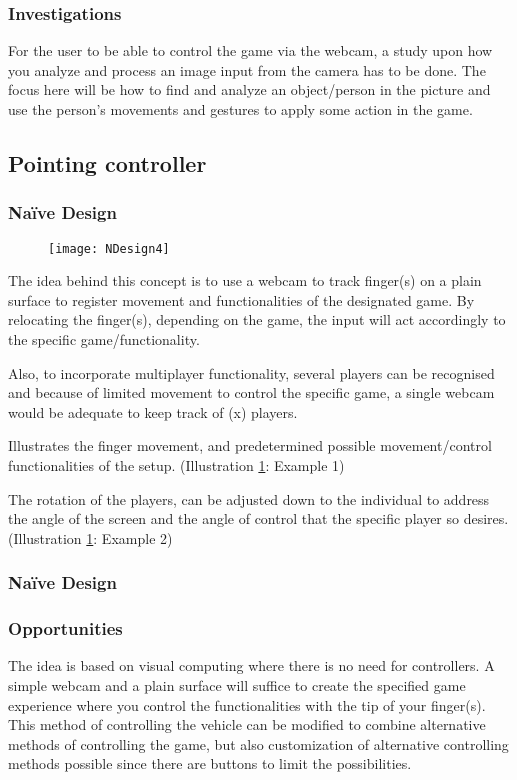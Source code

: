 \subsubsection*{Investigations}
For the user to be able to control the game via the webcam, a study upon how you analyze and process an image input from the camera has to be done. The focus here will be how to find and analyze an object/person in the picture and use the person’s movements and gestures to apply some action in the game.

\pagebreak

\subsection{Pointing controller} \label{nd4}
\subsubsection*{Naïve Design}
\begin{figure}[h]
\centering
\texttt{[image: NDesign4]}
\caption{}
\label{fig:ndesign4}
\end{figure}

The idea behind this concept is to use a webcam to track finger(s) on a plain surface to register movement and functionalities of the designated game. By relocating the finger(s), depending on the game, the input will act accordingly to the specific game/functionality.
\bigskip

Also, to incorporate multiplayer functionality, several players can be recognised and because of limited movement to control the specific game, a single webcam would be adequate to keep track of (x) players.
\bigskip

Illustrates the finger movement, and predetermined possible movement/control functionalities of the setup. (Illustration \ref{fig:ndesign4}: Example 1)
\bigskip

The rotation of the players, can be adjusted down to the individual to address the angle of the screen and the angle of control that the specific player so desires. (Illustration \ref{fig:ndesign4}: Example 2)


\subsubsection*{Naïve Design}
\subsubsection*{Opportunities}
The idea is based on visual computing where there is no need for controllers. A simple webcam and a plain surface will suffice to create the specified game experience where you control the functionalities with the tip of your finger(s). This method of controlling the vehicle can be modified to combine alternative methods of controlling the game, but also customization of alternative controlling methods possible since there are buttons to limit the possibilities.

